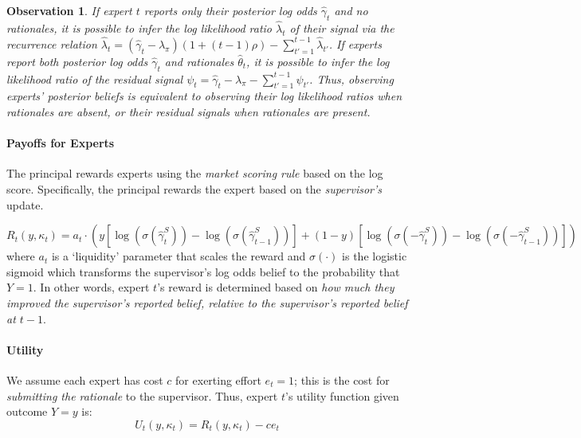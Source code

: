 \documentclass{winnower}
\newtheorem{observation}{Observation}
\begin{document}
\begin{observation}
    If expert $t$ reports only their posterior log odds $\hat{\gamma}_t$ and no rationales, it is possible to infer the log likelihood ratio $\hat{\lambda}_t$ of their signal via the recurrence relation $\hat{\lambda}_{t} = (\hat{\gamma}_t - \lambda_\pi)(1+(t-1)\rho) - \sum_{t'=1}^{t-1} \hat{\lambda}_{t'}$. If  experts report both posterior log odds $\hat{\gamma}_t$ and rationales $\hat{\theta}_t$, it is possible to infer the log likelihood ratio of the residual signal $\psi_t = \hat{\gamma}_t  - \lambda_\pi - \sum_{t'=1}^{t-1} \psi_{t'}$. Thus, observing experts' posterior beliefs is equivalent to observing their log likelihood ratios when rationales are absent, or their residual signals when rationales are present.
\end{observation}


\paragraph{Payoffs for Experts} The principal rewards experts using the \emph{market scoring rule} based on the log score. Specifically, the principal rewards the expert based on the \emph{supervisor's} update.

{\small
\begin{equation}
    R_t(y, \kappa_t) = a_t \cdot \left(y\left[\log\left( \sigma(\hat{\gamma}_{t}^{S}) \right) - \log(\sigma(\hat{\gamma}_{t-1}^S))\right] + (1-y)\left[\log\left( \sigma(-\hat{\gamma}_{t}^{S}) \right) - \log(\sigma(-\hat{\gamma}_{t-1}^S))\right]\right)
\end{equation}
}
where $a_t$ is a `liquidity' parameter that scales the reward and $\sigma(\cdot)$ is the logistic sigmoid which transforms the supervisor's log odds belief to the probability that $Y=1$. In other words, expert $t$'s reward is determined based on \emph{how much they improved the supervisor's reported belief, relative to the supervisor's reported belief at $t-1$}.

\paragraph{Utility} We assume each expert has cost $c$ for exerting effort $e_t=1$; this is the cost for \emph{submitting the rationale} to the supervisor. Thus, expert $t$'s utility function given outcome $Y=y$ is:
\begin{equation}
    U_t(y, \kappa_t) = R_t(y, \kappa_t) - ce_t
\end{equation}
\end{document}
